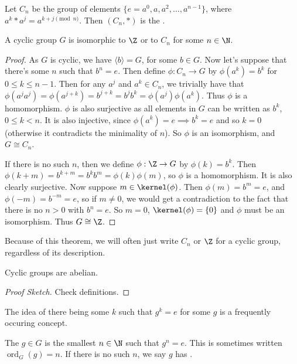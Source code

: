 \documentclass[a4]{scrreprt}
\begin{document}
\begin{definition}
	Let $C_n$ be the group of elements $\{e = a^0, a, a^2, \dots, a^{n - 1}\}$, where $a^k * a^j = a^{k + j \pmod{n}}$. Then $(C_n, *)$ is the .
\end{definition}

\begin{theorem}
	A cyclic group $G$ is isomorphic to $\Z$ or to $C_n$ for some $n \in \N$.
\end{theorem}
\begin{proof}
	As $G$ is cyclic, we have $\langle b \rangle = G$, for some $b \in G$.
	Now let's suppose that there's some $n$ such that $b^n = e$. Then define $\phi: C_n \rightarrow G$ by $\phi(a^k) = b^k$ for $0 \leq k \leq n - 1$.
	Then for any $a^j$ and $a^k \in C_n$, we trivially have that $\phi(a^j a^j) = \phi(a^{j + k}) = b^{j + k} = b^j b^k = \phi(a^j) \phi(a^k)$. Thus $\phi$ is a homomorphism.
	$\phi$ is also surjective as all elements in $G$ can be written as $b^k$, $0 \leq k < n$. It is also injective, since $\phi(a^k) = e \implies b^k = e$ and so $k = 0$ (otherwise it contradicts the minimality of $n$). So $\phi$ is an isomorphism, and $G \cong C_n$.

	If there is no such $n$, then we define $\phi : \Z \rightarrow G$ by $\phi(k) = b^k$. Then $\phi(k + m) = b^{k + m} = b^k b^m = \phi(k) \phi(m)$, so $\phi$ is a homomorphism. It is also clearly surjective.
	Now suppose $m \in \kernel(\phi)$. Then $\phi(m) = b^m = e$, and $\phi(-m) = b^{-m} = e$, so if $m \neq 0$, we would get a contradiction to the fact that there is no $n > 0$ with $b^n = e$. So $m = 0$, $\kernel(\phi) = \{0\}$ and $\phi$ must be an isomorphism. Thus $G \cong \Z$.
\end{proof}

Because of this theorem, we will often just write $C_n$ or $\Z$ for a cyclic group, regardless of its description.

\begin{proposition}
	Cyclic groups are abelian.
\end{proposition}
\begin{proof}[Proof Sketch]
	Check definitions.
\end{proof}

The idea of there being some $k$ such that $g^k = e$ for some $g$ is a frequently occuring concept.

\begin{definition}
	The  $g \in G$ is the smallest $n \in \N$ such that $g^n = e$. This is sometimes written $\operatorname{ord}_G(g) = n$. If there is no such $n$, we say $g$ has .
\end{definition}
\end{document}
